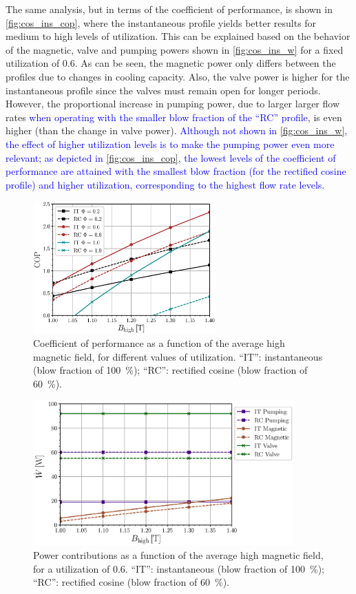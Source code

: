 \documentclass[referee]{svjour3}
\begin{document}
The same analysis, but in terms of the coefficient of performance, is shown in \autoref{fig:cos_ins_cop}, where  the instantaneous profile yields better results for medium to high levels of utilization. This can be explained based on the behavior of the magnetic, valve and pumping powers shown in   \autoref{fig:cos_ins_w} for a fixed utilization of 0.6. As can be seen, the magnetic power only differs between the profiles due to changes in cooling capacity. Also, the valve power is higher for the instantaneous profile since the valves must remain open for longer periods. However, the proportional increase in pumping power, due to larger larger flow rates \textcolor{blue}{when operating with the smaller blow fraction of the ``RC'' profile}, is even higher (than the change in valve power). \textcolor{blue}{Although not shown in \autoref{fig:cos_ins_w}, the effect of higher utilization levels is to make the pumping power even more relevant; as depicted in \autoref{fig:cos_ins_cop}, the lowest levels of the coefficient of performance are attained with the smallest blow fraction (for the rectified cosine profile) and higher utilization, corresponding to the highest flow rate levels.}  

\begin{figure}[!ht]
  \centering
\includegraphics[width=7cm]{Fig8-COP_B_comp_f_1_same_minimum}
  \caption{Coefficient of performance as a function of the  average high magnetic field, for different values of utilization. ``IT'': instantaneous (blow fraction of \SI{100}{\percent}); ``RC'': rectified cosine  (blow fraction of \SI{60}{\percent}).}
 \label{fig:cos_ins_cop}
\end{figure}



\begin{figure}[!ht]
  \centering
  \includegraphics[width=10cm]{Fig9-W_B_comp_f_1_Phi_60_same_minimum}
  \caption{Power contributions as a function of the average high magnetic field, for a utilization of 0.6. ``IT'': instantaneous (blow fraction of \SI{100}{\percent}); ``RC'': rectified cosine  (blow fraction of \SI{60}{\percent}).}
  \label{fig:cos_ins_w}
\end{figure}
\end{document}
